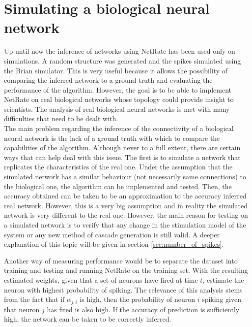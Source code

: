 
\chapter{Simulating a biological neural network}

Up until now the inference of networks using NetRate has been used only on simulations. A random structure was generated and the spikes simulated using the Brian simulator. This is very useful because it allows the possibility of comparing the inferred network to a ground truth and evaluating the performance of the algorithm. However, the goal is to be able to implement NetRate on real biological networks whose topology could provide insight to scientists. The analysis of real biological neural networks is met with many difficulties that need to be dealt with.\\

The main problem regarding the inference of the connectivity of a biological neural network is the lack of a ground truth with which to compare the capabilities of the algorithm. Although never to a full extent, there are certain ways that can help deal with this issue. The first is to simulate a network that replicates the characteristics of the real one. Under the assumption that the simulated network has a similar behaviour (not necessarily same connections) to the biological one, the algorithm can be implemented and tested. Then, the accuracy obtained can be taken to be an approximation to the accuracy inferred real network. However, this is a very big assumption and in reality the simulated network is very different to the real one. However, the main reason for testing on a simulated network is to verify that any change in the stimulation model of the system or any new method of cascade generation is still valid. A deeper explanation of this topic will be given in section \ref{sec:number_of_spikes}.

Another way of measuring performance would be to separate the dataset into training and testing and running NetRate on the training set. With the resulting estimated weights, given that a set of neurons have fired at time \(t\), estimate the neuron with highest probability of spiking. The relevance of this analysis stems from the fact that if \(\alpha_{j,i}\) is high, then the probability of neuron \(i\) spiking given that neuron \(j\) has fired is also high. If the accuracy of prediction is sufficiently high, the network can be taken to be correctly inferred.\\

